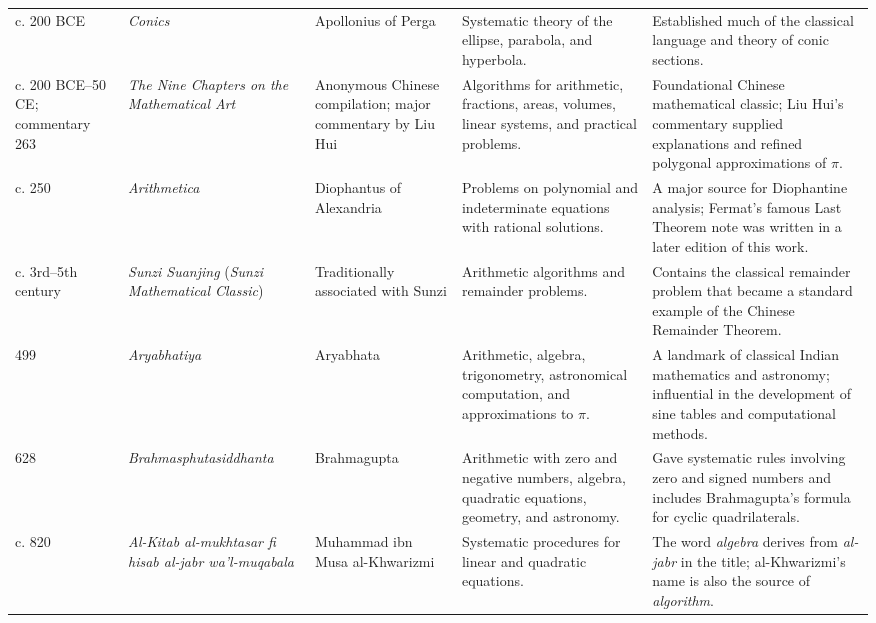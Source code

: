 {\begin{longtable}{@{}L{0.08\textwidth}L{0.21\textwidth}L{0.15\textwidth}L{0.22\textwidth}L{0.26\textwidth}@{}}
        c. 200 BCE
        & \textit{Conics}
        & Apollonius of Perga
        & Systematic theory of the ellipse, parabola, and hyperbola.
        & Established much of the classical language and theory of conic sections. \\

        c. 200 BCE--50 CE; commentary 263
        & \textit{The Nine Chapters on the Mathematical Art}
        & Anonymous Chinese compilation; major commentary by Liu Hui
        & Algorithms for arithmetic, fractions, areas, volumes, linear systems, and practical problems.
        & Foundational Chinese mathematical classic; Liu Hui's commentary supplied explanations and refined polygonal approximations of $\pi$. \\

        c. 250
        & \textit{Arithmetica}
        & Diophantus of Alexandria
        & Problems on polynomial and indeterminate equations with rational solutions.
        & A major source for Diophantine analysis; Fermat's famous Last Theorem note was written in a later edition of this work. \\

        c. 3rd--5th century
        & \textit{Sunzi Suanjing} (\textit{Sunzi Mathematical Classic})
        & Traditionally associated with Sunzi
        & Arithmetic algorithms and remainder problems.
        & Contains the classical remainder problem that became a standard example of the Chinese Remainder Theorem. \\

        499
        & \textit{Aryabhatiya}
        & Aryabhata
        & Arithmetic, algebra, trigonometry, astronomical computation, and approximations to $\pi$.
        & A landmark of classical Indian mathematics and astronomy; influential in the development of sine tables and computational methods. \\

        628
        & \textit{Brahma\-sphuta\-siddhanta}
        & Brahmagupta
        & Arithmetic with zero and negative numbers, algebra, quadratic equations, geometry, and astronomy.
        & Gave systematic rules involving zero and signed numbers and includes Brahmagupta's formula for cyclic quadrilaterals. \\

        c. 820
        & \textit{Al-Kitab al-mukhtasar fi hisab al-jabr wa'l-muqabala}
        & Muhammad ibn Musa al-Khwarizmi
        & Systematic procedures for linear and quadratic equations.
        & The word \emph{algebra} derives from \emph{al-jabr} in the title; al-Khwarizmi's name is also the source of \emph{algorithm}. \\


\end{longtable}}

